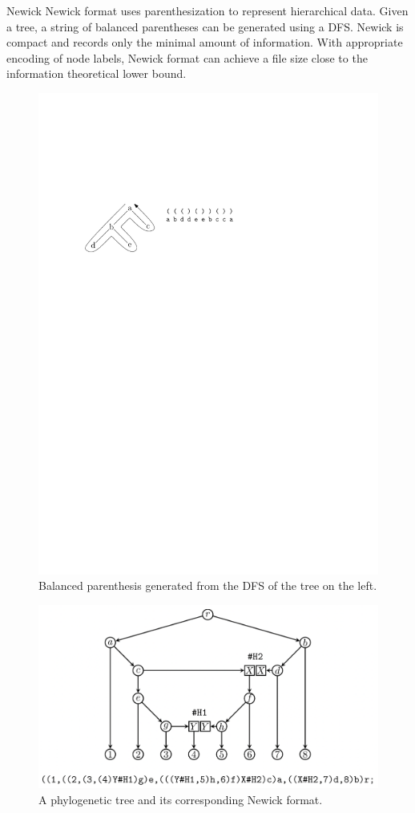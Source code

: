 \documentclass{beamer}
\begin{document}
\begin{frame}{Newick}
    Newick format uses parenthesization to represent hierarchical data. Given a tree, a string of balanced parentheses can be generated using a DFS. Newick is compact and records only the minimal amount of information. With appropriate encoding of node labels, Newick format can achieve a file size close to the information theoretical lower bound.

    \begin{figure}[htbp]
        \centering
        \includegraphics[width=0.5\linewidth]{res/balanced-paren.pdf}
        \caption{Balanced parenthesis generated from the DFS of the tree on the left.}
        \label{fig:parentheses}
    \end{figure}
\end{frame}

\begin{frame}
    \begin{figure}[htbp]
        \centering
        \includegraphics[width=0.7\linewidth]{res/newick.png}
        \caption{A phylogenetic tree and its corresponding Newick format.}
        \label{fig:newick}
    \end{figure}
\end{frame}
\end{document}
